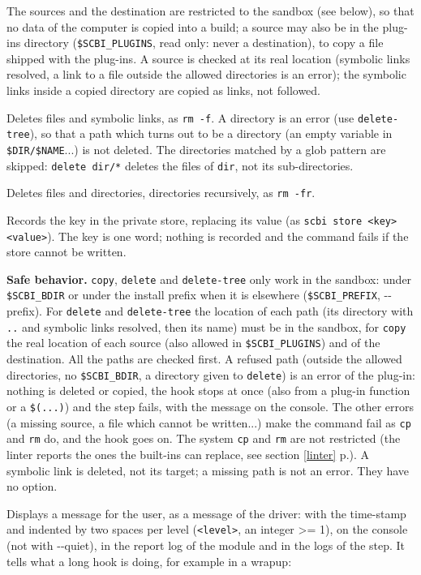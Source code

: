\documentclass[a4paper,12pt,twoside]{article}
\newcommand{\code}[1]{\texttt{#1}}
\newcommand{\seeref}[1]{see section \ref{#1} p.\pageref{#1}}
\newcommand{\ddash}{-{}-}
\begin{document}
\begin{description}
	The sources and the destination are restricted to the sandbox (see
	below), so that no data of the computer is copied into a build; a
	source may also be in the plug-ins directory (\code{\$SCBI\_PLUGINS},
	read only: never a destination), to copy a file shipped with the
	plug-ins. A source is checked at its real location (symbolic links
	resolved, a link to a file outside the allowed directories is an
	error); the symbolic links inside a copied directory are copied as
	links, not followed.
	\item[delete <path>...] Deletes files and symbolic links,
	as \code{rm -f}. A directory is an error (use \code{delete-tree}), so
	that a path which turns out to be a directory (an empty variable in
	\code{\$DIR/\$NAME}...) is not deleted. The directories matched by a
	glob pattern are skipped: \code{delete dir/*} deletes the files of
	\code{dir}, not its sub-directories.
	\item[delete-tree <path>...] Deletes files and
	directories, directories recursively, as \code{rm -fr}.
	\item[store-set-key <key> <value>] Records the key in the private store, replacing its value (as \code{scbi store <key> <value>}). The key is one word; nothing is recorded and the command fails if the store cannot be written.

	\textbf{Safe behavior.} \code{copy}, \code{delete} and
	\code{delete-tree} only work in the sandbox: under \code{\$SCBI\_BDIR}
	or under the install prefix when it is elsewhere
	(\code{\$SCBI\_PREFIX}, \ddash{}prefix). For \code{delete} and
	\code{delete-tree} the location of each path (its directory with
	\code{..} and symbolic links resolved, then its name) must be in the
	sandbox, for \code{copy} the real location of each source (also
	allowed in \code{\$SCBI\_PLUGINS}) and of the destination. All the
	paths are checked first. A refused path (outside the allowed
	directories, no \code{\$SCBI\_BDIR}, a directory given to
	\code{delete}) is an error of the plug-in: nothing is deleted or
	copied, the hook stops at once (also from a plug-in function or a
	\code{\$(...)}) and the step fails, with the message on the console.
	The other errors (a missing source, a file which cannot be
	written...) make the command fail as \code{cp} and \code{rm} do,
	and the hook goes on. The system
	\code{cp} and \code{rm} are not restricted (the linter reports the
	ones the built-ins can replace, \seeref{linter}). A symbolic link is
	deleted, not its target; a missing path is not an error. They have no
	option.
	\item[log <level> <message>] Displays a message for the
	user, as a message of the driver: with the time-stamp and indented by
	two spaces per level (\code{<level>}, an integer >= 1), on the console
	(not with \ddash{}quiet), in the report log of the module and in the
	logs of the step. It tells what a long hook is doing, for example in a
	wrapup:


\end{description}
\end{document}
